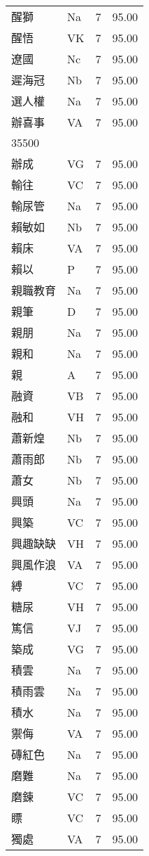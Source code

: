 \documentclass[twocolumn]{book}
\begin{document}
\begin{supertabular}{llrr}
醒獅 & Na & 7 &  95.00\\
醒悟 & VK & 7 &  95.00\\
遼國 & Nc & 7 &  95.00\\
遲海冠 & Nb & 7 &  95.00\\
選人權 & Na & 7 &  95.00\\
辦喜事 & VA & 7 &  95.00\\
35500\\
辦成 & VG & 7 &  95.00\\
輸往 & VC & 7 &  95.00\\
輸尿管 & Na & 7 &  95.00\\
賴敏如 & Nb & 7 &  95.00\\
賴床 & VA & 7 &  95.00\\
賴以 & P & 7 &  95.00\\
親職教育 & Na & 7 &  95.00\\
親筆 & D & 7 &  95.00\\
親朋 & Na & 7 &  95.00\\
親和 & Na & 7 &  95.00\\
親 & A & 7 &  95.00\\
融資 & VB & 7 &  95.00\\
融和 & VH & 7 &  95.00\\
蕭新煌 & Nb & 7 &  95.00\\
蕭雨郎 & Nb & 7 &  95.00\\
蕭女 & Nb & 7 &  95.00\\
興頭 & Na & 7 &  95.00\\
興築 & VC & 7 &  95.00\\
興趣缺缺 & VH & 7 &  95.00\\
興風作浪 & VA & 7 &  95.00\\
縛 & VC & 7 &  95.00\\
糖尿 & VH & 7 &  95.00\\
篤信 & VJ & 7 &  95.00\\
築成 & VG & 7 &  95.00\\
積雲 & Na & 7 &  95.00\\
積雨雲 & Na & 7 &  95.00\\
積水 & Na & 7 &  95.00\\
禦侮 & VA & 7 &  95.00\\
磚紅色 & Na & 7 &  95.00\\
磨難 & Na & 7 &  95.00\\
磨鍊 & VC & 7 &  95.00\\
瞟 & VC & 7 &  95.00\\
獨處 & VA & 7 &  95.00\\

\end{supertabular}
\end{document}
